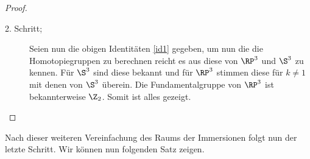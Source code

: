 \begin{Lem}
\begin{proof}
\begin{description}
                \item[2. Schritt;] Seien nun die obigen Identitäten
                  \ref{id1}  gegeben, um nun die
                  die Homotopiegruppen zu berechnen reicht es aus
                  diese von $\RP^3$ und $ \S^3 $ zu kennen. Für
                  $ \S^3 $ sind diese bekannt und für $ \RP^3 $
                  stimmen diese für $ k \neq 1 $ mit denen von
                  $ \S^3 $ überein. Die Fundamentalgruppe von
                  $ \RP^3 $ ist bekannterweise $ \Z_2 $. Somit ist
                  alles gezeigt.
		\end{description}
		
		
		
	\end{proof}
	
\end{Lem}

Nach dieser weiteren Vereinfachung des Raums der Immersionen folgt nun
der letzte Schritt. Wir können nun folgenden Satz zeigen.




